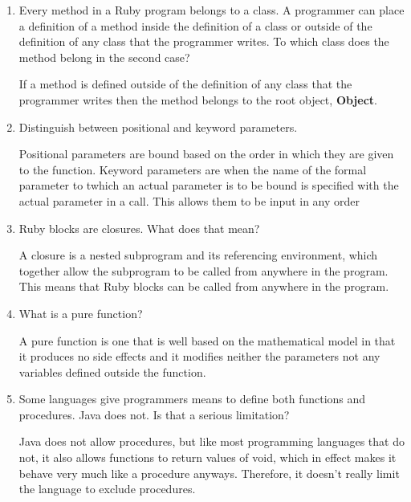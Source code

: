\begin{enumerate}
\begin{answer}
  \end{answer}

  \item Every method in a Ruby program belongs to a class.
    A programmer can place a definition of a method inside
    the definition of a class or outside of the definition
    of any class that the programmer writes. To which class
    does the method belong in the second case?

  \begin{answer}
   If a method is defined outside of the definition of any class that the programmer writes then the method belongs to the root object, \textbf{Object}.
  \end{answer}

  \item Distinguish between positional and keyword parameters.

  \begin{answer}
   Positional parameters are bound based on the order in which they are given to the function. Keyword parameters are when the name of the formal parameter to twhich an actual parameter is to be bound is specified with the actual parameter in a call. This allows them to be input in any order
  \end{answer}

  \item Ruby blocks are closures. What does that mean?

  \begin{answer}
   A closure is a nested subprogram and its referencing environment, which together allow the subprogram to be called from anywhere in the program. This means that Ruby blocks can be called from anywhere in the program.
  \end{answer}

  \item What is a pure function?

  \begin{answer}
   A pure function is one that is well based on the mathematical model in that it produces no side effects and it modifies neither the parameters not any variables defined outside the function.
  \end{answer}

  \item Some languages give programmers means to define
    both functions and procedures. Java does not. Is that
    a serious limitation?

  \begin{answer}
   Java does not allow procedures, but like most programming languages that do not, it also allows functions to return values of void, which in effect makes it behave very much like a procedure anyways. Therefore, it doesn't really limit the language to exclude procedures.
  \end{answer}


\end{enumerate}
